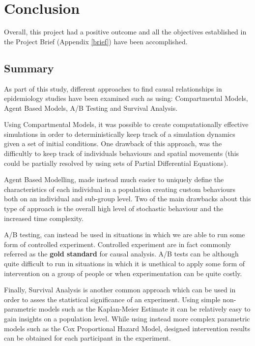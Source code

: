 \chapter{Conclusion}

\label{ch:planwork}
\setlength\lineskip{0pt}
\vspace*{15pt}

Overall, this project had a positive outcome and all the objectives established in the Project Brief (Appendix \ref{brief}) have been accomplished.

\section{Summary}
As part of this study, different approaches to find causal relationships in epidemiology studies have been examined such as using: Compartmental Models, Agent Based Models, A/B Testing and Survival Analysis.

Using Compartmental Models, it was possible to create computationally effective simulations in order to deterministically keep track of a simulation dynamics given a set of initial conditions. One drawback of this approach, was the difficultly to keep track of individuals behaviours and spatial movements (this could be partially resolved by using sets of Partial Differential Equations).

Agent Based Modelling, made instead much easier to uniquely define the characteristics of each individual in a population creating custom behaviours both on an individual and sub-group level. Two of the main drawbacks about this type of approach is the overall high level of stochastic behaviour and the increased time complexity.

A/B testing, can instead be used in situations in which we are able to run some form of controlled experiment. Controlled experiment are in fact commonly referred as the \textbf{gold standard} for causal analysis. A/B tests can be although quite difficult to run in situations in which it is unethical to apply some form of intervention on a group of people or when experimentation can be quite costly.

Finally, Survival Analysis is another common approach which can be used in order to asses the statistical significance of an experiment. Using simple non-parametric models such as the Kaplan-Meier Estimate it can be relatively easy to gain insights on a population level. While using instead more complex parametric models such as the Cox Proportional Hazard  Model, designed intervention results can be obtained for each participant in the experiment.

